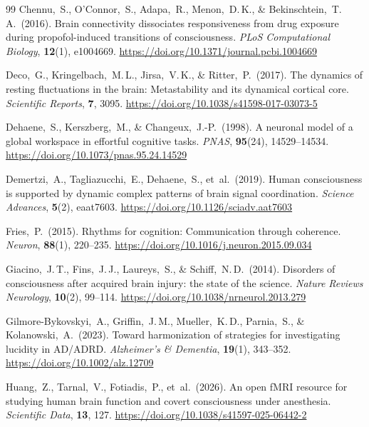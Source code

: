 \documentclass[11pt,a4paper]{article}
\theoremstyle{plain}
\theoremstyle{definition}
\theoremstyle{remark}
\begin{document}
\begin{thebibliography}{99}
Chennu,~S., O'Connor,~S., Adapa,~R., Menon,~D.\,K., \& Bekinschtein,~T.\,A.\ (2016).
Brain connectivity dissociates responsiveness from drug exposure during propofol-induced transitions of consciousness.
\textit{PLoS Computational Biology}, \textbf{12}(1), e1004669.
\url{https://doi.org/10.1371/journal.pcbi.1004669}

Deco,~G., Kringelbach,~M.\,L., Jirsa,~V.\,K., \& Ritter,~P.\ (2017).
The dynamics of resting fluctuations in the brain: Metastability and its dynamical cortical core.
\textit{Scientific Reports}, \textbf{7}, 3095.
\url{https://doi.org/10.1038/s41598-017-03073-5}

Dehaene,~S., Kerszberg,~M., \& Changeux,~J.-P.\ (1998).
A neuronal model of a global workspace in effortful cognitive tasks.
\textit{PNAS}, \textbf{95}(24), 14529--14534.
\url{https://doi.org/10.1073/pnas.95.24.14529}

Demertzi,~A., Tagliazucchi,~E., Dehaene,~S., et~al.\ (2019).
Human consciousness is supported by dynamic complex patterns of brain signal coordination.
\textit{Science Advances}, \textbf{5}(2), eaat7603.
\url{https://doi.org/10.1126/sciadv.aat7603}

Fries,~P.\ (2015).
Rhythms for cognition: Communication through coherence.
\textit{Neuron}, \textbf{88}(1), 220--235.
\url{https://doi.org/10.1016/j.neuron.2015.09.034}

Giacino,~J.\,T., Fins,~J.\,J., Laureys,~S., \& Schiff,~N.\,D.\ (2014).
Disorders of consciousness after acquired brain injury: the state of the science.
\textit{Nature Reviews Neurology}, \textbf{10}(2), 99--114.
\url{https://doi.org/10.1038/nrneurol.2013.279}

Gilmore-Bykovskyi,~A., Griffin,~J.\,M., Mueller,~K.\,D., Parnia,~S., \& Kolanowski,~A.\ (2023).
Toward harmonization of strategies for investigating lucidity in AD/ADRD.
\textit{Alzheimer's \& Dementia}, \textbf{19}(1), 343--352.
\url{https://doi.org/10.1002/alz.12709}

Huang,~Z., Tarnal,~V., Fotiadis,~P., et~al.\ (2026).
An open fMRI resource for studying human brain function and covert consciousness under anesthesia.
\textit{Scientific Data}, \textbf{13}, 127.
\url{https://doi.org/10.1038/s41597-025-06442-2}


\end{thebibliography}
\end{document}
